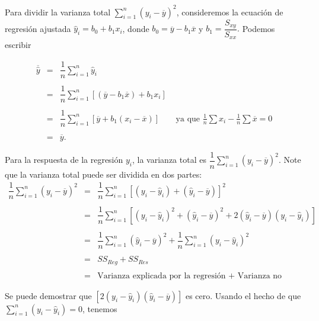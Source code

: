 Para dividir la varianza total $\sum\limits_{i=1}^n\left(y_i-\overline{y}\right)^2$, consideremos la ecuación de regresión ajustada $\hat{y}_i=b_0+b_1x_i$, donde $b_0=\overline{y}-b_1\overline{x}$ y $b_1=\dfrac{S_{xy}}{S_{xx}}.$ Podemos escribir

$$
\begin{array}{rcll}
    \overline{\hat{y}}&=&\dfrac{1}{n}\displaystyle\sum_{i=1}^n\hat{y}_i&\\\\
		      &=&\dfrac{1}{n}\displaystyle\sum_{i=1}^n\left[\left(\overline{y}-b_1\overline{x}\right)+b_1x_i\right]&\\\\
		      &=&\dfrac{1}{n}\displaystyle\sum_{i=1}^n\left[\overline{y}+b_1\left(x_i-\overline{x}\right)\right]& \mbox{ ya que } \frac{1}{n}\sum\limits x_i-\frac{1}{n}\sum\limits \overline{x}=0\\\\
		      &=&\overline{y}.&
\end{array}
$$

Para la respuesta de la regresión $y_i$, la varianza total es $\dfrac{1}{n}\sum\limits_{i=1}^n\left(y_i-\overline{y}\right)^2$. Note que la varianza total puede ser dividida en dos partes:
$$
\begin{array}{rcl}
    \dfrac{1}{n}\displaystyle\sum_{i=1}^n \left(y_i-\overline{y}\right)^2 &=& \dfrac{1}{n}\displaystyle\sum_{i=1}^n \left[\left(y_i-\hat{y}_i\right)+\left(\hat{y}_i-\overline{y}\right)\right]^2\\\\
									  &=& \dfrac{1}{n}\displaystyle\sum_{i=1}^n \left[\left(y_i-\hat{y}_i\right)^2+\left(\hat{y}_i-\overline{y}\right)^2+2\left(\hat{y}_i-\overline{y}\right)\left(y_i-\hat{y}_i\right)\right]\\\\
									  &=& \dfrac{1}{n}\displaystyle\sum_{i=1}^n \left(\hat{y}_i-\overline{y}\right)^2 + \dfrac{1}{n}\displaystyle\sum_{i=1}^n \left(y_i-\hat{y}_i\right)^2\\\\
									  &=&SS_{Reg} + SS_{Res}\\\\
									  &=& \mbox{Varianza explicada por la regresión + Varianza no explicada}
\end{array}
$$

Se puede demostrar que $\left[2\left(y_i-\hat{y}_i\right)\left(\hat{y}_i-\overline{y}\right)\right]$ es cero. Usando el hecho de que $\sum\limits_{i=1}^n\left(y_i-\hat{y}_i\right)=0$, tenemos

